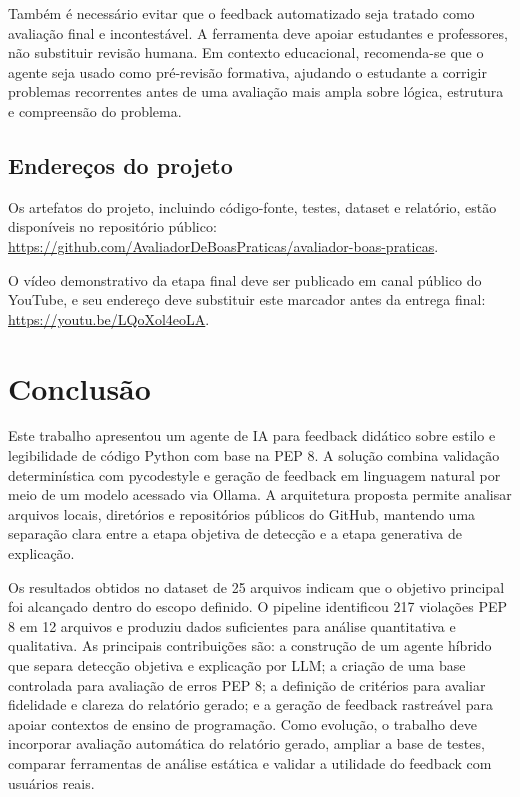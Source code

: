 \documentclass[12pt]{article}
\begin{document}
Também é necessário evitar que o feedback automatizado seja tratado como
avaliação final e incontestável. A ferramenta deve apoiar estudantes e
professores, não substituir revisão humana. Em contexto educacional, recomenda-se
que o agente seja usado como pré-revisão formativa, ajudando o estudante a
corrigir problemas recorrentes antes de uma avaliação mais ampla sobre lógica,
estrutura e compreensão do problema.

\subsection{Endereços do projeto}

Os artefatos do projeto, incluindo código-fonte, testes, dataset e relatório,
estão disponíveis no repositório público:
\url{https://github.com/AvaliadorDeBoasPraticas/avaliador-boas-praticas}.

O vídeo demonstrativo da etapa final deve ser publicado em canal público do
YouTube, e seu endereço deve substituir este marcador antes da entrega final:
\url{https://youtu.be/LQoXol4eoLA}.

\section{Conclusão}

Este trabalho apresentou um agente de IA para feedback didático sobre estilo e
legibilidade de código Python com base na PEP 8. A solução combina validação
determinística com pycodestyle e geração de feedback em linguagem natural por
meio de um modelo acessado via Ollama. A arquitetura proposta permite analisar
arquivos locais, diretórios e repositórios públicos do GitHub, mantendo uma
separação clara entre a etapa objetiva de detecção e a etapa generativa de
explicação.

Os resultados obtidos no dataset de 25 arquivos indicam que o objetivo principal
foi alcançado dentro do escopo definido. O pipeline identificou 217 violações PEP
8 em 12 arquivos e produziu dados suficientes para análise quantitativa e
qualitativa. As principais contribuições são: a construção de um agente híbrido
que separa detecção objetiva e explicação por LLM; a criação de uma base
controlada para avaliação de erros PEP 8; a definição de critérios para avaliar
fidelidade e clareza do relatório gerado; e a geração de feedback rastreável
para apoiar contextos de ensino de programação. Como evolução, o trabalho deve
incorporar avaliação automática do relatório gerado, ampliar a base de testes,
comparar ferramentas de análise estática e validar a utilidade do feedback com
usuários reais.
\end{document}
